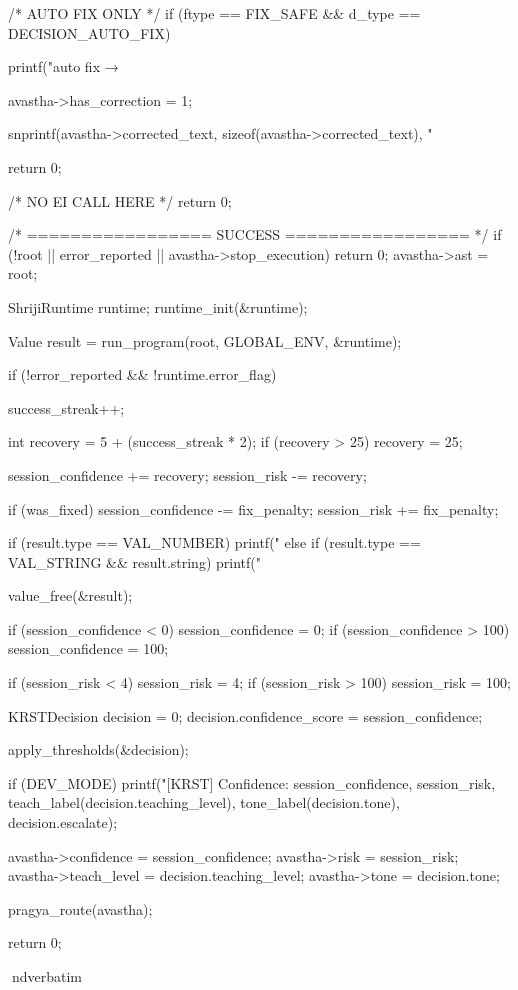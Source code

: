 \documentclass{article}
\begin{document}
{{        /* AUTO FIX ONLY */
        if (ftype == FIX_SAFE && d_type == DECISION_AUTO_FIX)
        {
            printf("\n[Shriji] auto fix → %

            avastha->has_correction = 1;

            snprintf(avastha->corrected_text,
                     sizeof(avastha->corrected_text),
                     "%

            return 0;
        }

        /*  NO EI CALL HERE */
        return 0;
    }

    /* ================= SUCCESS ================= */
   if (!root || error_reported || avastha->stop_execution)
{
    return 0;
}
    avastha->ast = root;

    ShrijiRuntime runtime;
    runtime_init(&runtime);

    Value result = run_program(root, GLOBAL_ENV, &runtime);

    if (!error_reported && !runtime.error_flag)
{
        success_streak++;

        int recovery = 5 + (success_streak * 2);
        if (recovery > 25) recovery = 25;

        session_confidence += recovery;
        session_risk -= recovery;

        if (was_fixed)
        {
            session_confidence -= fix_penalty;
            session_risk += fix_penalty;
        }

        if (result.type == VAL_NUMBER)
            printf("%
        else if (result.type == VAL_STRING && result.string)
            printf("%
    }

    value_free(&result);

    if (session_confidence < 0) session_confidence = 0;
    if (session_confidence > 100) session_confidence = 100;

    if (session_risk < 4) session_risk = 4;
    if (session_risk > 100) session_risk = 100;

    KRSTDecision decision = {0};
    decision.confidence_score = session_confidence;

    apply_thresholds(&decision);

    if (DEV_MODE)
    {
        printf("[KRST] Confidence: %
               session_confidence,
               session_risk,
               teach_label(decision.teaching_level),
               tone_label(decision.tone),
               decision.escalate);
    }

    avastha->confidence = session_confidence;
    avastha->risk = session_risk;
    avastha->teach_level = decision.teaching_level;
    avastha->tone = decision.tone;

    pragya_route(avastha);

    return 0;
}
nd{verbatim}
\end{document}
